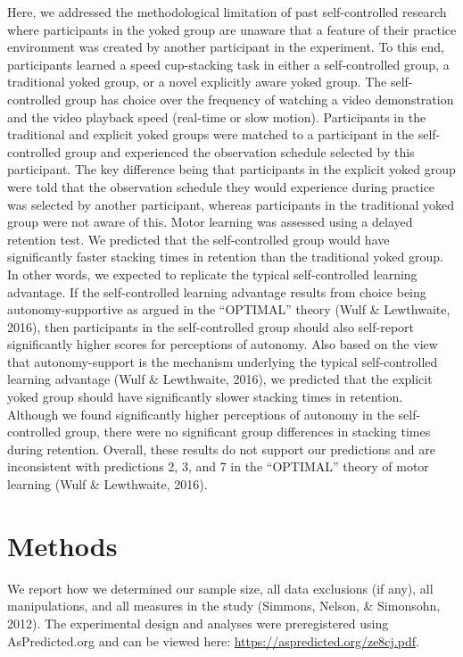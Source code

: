 \documentclass[
  english,
  man, donotrepeattitle,floatsintext]{apa7}
\begin{document}
Here, we addressed the methodological limitation of past self-controlled research where participants in the yoked group are unaware that a feature of their practice environment was created by another participant in the experiment. To this end, participants learned a speed cup-stacking task in either a self-controlled group, a traditional yoked group, or a novel explicitly aware yoked group. The self-controlled group has choice over the frequency of watching a video demonstration and the video playback speed (real-time or slow motion). Participants in the traditional and explicit yoked groups were matched to a participant in the self-controlled group and experienced the observation schedule selected by this participant. The key difference being that participants in the explicit yoked group were told that the observation schedule they would experience during practice was selected by another participant, whereas participants in the traditional yoked group were not aware of this. Motor learning was assessed using a delayed retention test. We predicted that the self-controlled group would have significantly faster stacking times in retention than the traditional yoked group. In other words, we expected to replicate the typical self-controlled learning advantage. If the self-controlled learning advantage results from choice being autonomy-supportive as argued in the ``OPTIMAL'' theory (Wulf \& Lewthwaite, 2016), then participants in the self-controlled group should also self-report significantly higher scores for perceptions of autonomy. Also based on the view that autonomy-support is the mechanism underlying the typical self-controlled learning advantage (Wulf \& Lewthwaite, 2016), we predicted that the explicit yoked group should have significantly slower stacking times in retention. Although we found significantly higher perceptions of autonomy in the self-controlled group, there were no significant group differences in stacking times during retention. Overall, these results do not support our predictions and are inconsistent with predictions 2, 3, and 7 in the ``OPTIMAL'' theory of motor learning (Wulf \& Lewthwaite, 2016).

\hypertarget{methods}{%
\section{Methods}\label{methods}}

We report how we determined our sample size, all data exclusions (if any), all manipulations, and all measures in the study (Simmons, Nelson, \& Simonsohn, 2012). The experimental design and analyses were preregistered using AsPredicted.org and can be viewed here: \url{https://aspredicted.org/ze8cj.pdf}.
\end{document}
